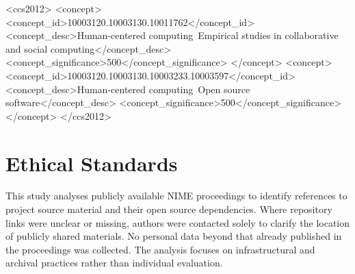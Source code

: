 \documentclass[sigconf]{nimeart}
\begin{document}

\begin{CCSXML}
<ccs2012>
<concept>
<concept_id>10003120.10003130.10011762</concept_id>
<concept_desc>Human-centered computing~Empirical studies in collaborative and social computing</concept_desc>
<concept_significance>500</concept_significance>
</concept>
<concept>
<concept_id>10003120.10003130.10003233.10003597</concept_id>
<concept_desc>Human-centered computing~Open source software</concept_desc>
<concept_significance>500</concept_significance>
</concept>
</ccs2012>
\end{CCSXML}

\maketitle


% 


\section{Ethical Standards}
This study analyses publicly available NIME proceedings to identify references to project source material and their open source dependencies. Where repository links were unclear or missing, authors were contacted solely to clarify the location of publicly shared materials. No personal data beyond that already published in the proceedings was collected. The analysis focuses on infrastructural and archival practices rather than individual evaluation.
\end{document}
